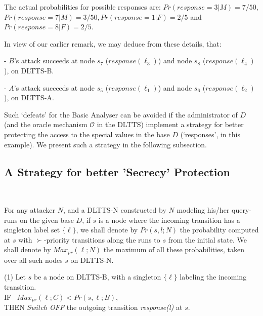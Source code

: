 \documentclass[pdflatex]{article}
\def \o {{\mathcal{O}}}
\def \lft {\noindent}
\begin{document}
The actual probabilities for possible responses are:  $Pr(response = 3|M) = 7/50$, \\
 $Pr(response = 7|M) = 3/50, Pr(response = 1|F) = 2/5$ and $Pr(response = 8|F) = 2/5$.


\vspace*{2mm}
In view of our earlier remark,  we may deduce from these details, that: \par
 - $B$'s attack  succeeds at node $s_7$ ($response(\ell_3)$) and 
   node $s_8$ ($response(\ell_4)$), on DLTTS-B. \par 
 - $A$'s attack succeeds at node $s_5$ ($response(\ell_1)$)  and 
   node $s_6$ ($response(\ell_2)$), on DLTTS-A. 

 \vspace*{1.5mm}
 Such `defeats' for the Basic Analyser can be avoided if the administrator of  $D$ (and
 the oracle mechanism $\o$ in the DLTTS) implement a strategy for  better  protecting
 the access to the special values in the base $D$ (`responses', in this example). 
 We present such a strategy in  the following subsection. 

\vspace*{-1.5em}
\subsection{A Strategy for better 'Secrecy' Protection}~\label{Strategy}
\vspace*{-1.5em}

For any attacker $N$, and  a  DLTTS-N constructed by $N$  modeling his/her
query-runs on the given base $D$,  if $s$ is a node where the incoming transition
has a singleton label set  $\{\ell\}$, we shall denote by $Pr(s, l; N)$ the probability
computed at $s$ with $\succ$-priority transitions along the runs to $s$ from 
the initial state. We shall denote by $Max_{pr}(\ell; N)$ the maximum
of all these probabilities, taken over all such nodes $s$ on DLTTS-N. 

\vspace*{1mm} \lft
(1)  Let $s$ be a node on DLTTS-B, with a singleton $\{\ell\}$ labeling the  incoming
transition.  \\ 
\hspace*{2.2cm} IF \, $Max_{pr}(\ell; C)  <  Pr(s, \ell; B) $,  \\ 
\hspace*{1.5cm}  THEN {\em Switch OFF} the outgoing transition
                                                    {\em response(l)} at $s$.
        
\end{document}
